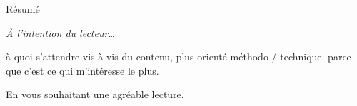 
\thispagestyle{thesis-empty}

Résumé

\begin{comment}

\clearpage
\thispagestyle{thesis-empty}

\section*{Remerciements}
\label{sec:thanks}

la colloc étendu: théo, thomas, arthur, rémi, rémy, clément, sarah
parler du confinement ?
les potos: benjamin, marie, charlie, paul, jessie, piwi

la mifa

mon comité de thèse ? Sakina, Daniele

le 426 le meilleur bureau, tous les autres doctorants et post-doctorants et stagiaires
c'est quand même vachement plus fun avec elleux.

l'équipe admin du labo, bigup
\end{comment}

\clearpage
\thispagestyle{thesis-empty}

\vspace*{5ex}
\par\addvspace{\beforesecskip}\addvspace{\baselineskip}
\par\noindent\textit{À l'intention du lecteur\dots}\par
\vspace{\aftersecskip}

à quoi s'attendre vis à vis du contenu, plus orienté méthodo / technique.
parce que c'est ce qui m'intéresse le plus.

En vous souhaitant une agréable lecture.

\clearpage
\thispagestyle{thesis-empty}

\label{sec:productions}

